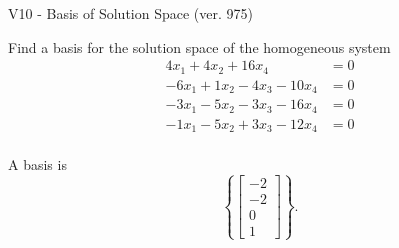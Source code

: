 \begin{exercise}
  \begin{exerciseTitle}V10 - Basis of Solution Space (ver. 975)\end{exerciseTitle}
  \begin{exerciseStatement}
    Find a basis for the solution space of the homogeneous system 
\begin{align*}
 4 x_ 1 + 4 x_ 2 + 16 x_ 4 &= 0  \\ 
  -6 x_ 1 + 1 x_ 2 -4 x_ 3 -10 x_ 4 &= 0  \\ 
  -3 x_ 1 -5 x_ 2 -3 x_ 3 -16 x_ 4 &= 0  \\ 
  -1 x_ 1 -5 x_ 2 + 3 x_ 3 -12 x_ 4 &= 0  \\ 
 \end{align*}


 
  \end{exerciseStatement}

  \begin{exerciseAnswer}
   A basis is   
\[\left\{\left[\begin{array}{c}
-2 \\
-2 \\
0 \\
1
\end{array}\right]\right\}.\]

  


  \end{exerciseAnswer}
\end{exercise}